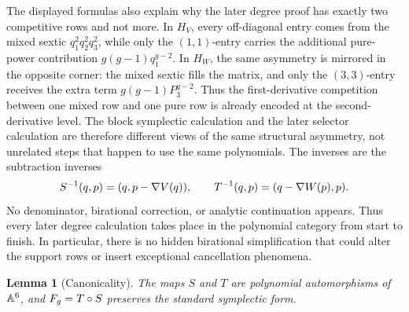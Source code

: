 \documentclass[11pt]{article}
\newtheorem{lemma}[theorem]{Lemma}
\theoremstyle{remark}
\numberwithin{equation}{section}
\begin{document}
The displayed formulas also explain why the later degree proof has exactly two
competitive rows and not more.  In \(H_V\), every off-diagonal entry comes from
the mixed sextic \(q_1^2q_2^2q_3^2\), while only the \((1,1)\)-entry carries
the additional pure-power contribution \(g(g-1)q_1^{g-2}\).  In \(H_W\), the
same asymmetry is mirrored in the opposite corner: the mixed sextic fills the
matrix, and only the \((3,3)\)-entry receives the extra term
\(g(g-1)P_3^{g-2}\).  Thus the first-derivative competition between one mixed
row and one pure row is already encoded at the second-derivative level.  The
block symplectic calculation and the later selector calculation are therefore
different views of the same structural asymmetry, not unrelated steps that
happen to use the same polynomials.
The inverses are the subtraction inverses
\[
S^{-1}(q,p)=(q,p-\nabla V(q)),\qquad
T^{-1}(q,p)=(q-\nabla W(p),p).
\]
No denominator, birational correction, or analytic continuation appears.
Thus every later degree calculation takes place in the polynomial category from
start to finish.  In particular, there is no hidden birational simplification
that could alter the support rows or insert exceptional cancellation
phenomena.

\begin{lemma}[Canonicality]\label{lem:canonical}
The maps \(S\) and \(T\) are polynomial automorphisms of \(\mathbb{A}^6\), and
\(F_g=T\circ S\) preserves the standard symplectic form.
\end{lemma}
\end{document}
